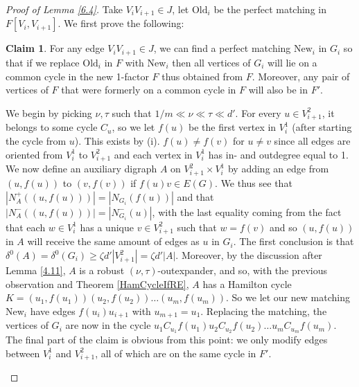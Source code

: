 \documentclass[10pt,letterpaper, reqno]{amsart}
\theoremstyle{definition}
\numberwithin{equation}{section}
\newtheorem*{claimnonum}{Claim}
\begin{document}
\begin{proof}[Proof of Lemma \ref{6.4}]
	Take $V_i V_{i+1} \in J$, let $\text{Old}_i$ be the perfect matching in $F[V_i,V_{i+1}]$. We first prove the following:
	
	\begin{claimnonum}
		For any edge $V_i V_{i+1} \in J$, we can find a perfect matching $\text{New}_i$ in $G_i$ so that if we replace $\text{Old}_i$ in $F$ with New$_i$ then all vertices of $G_i$ will lie on a common cycle in the new 1-factor $F$ thus obtained from $F$. Moreover, any pair of vertices of $F$ that were formerly on a common cycle in $F$ will also be in $F'$. 
	\end{claimnonum}
	
	\begin{adjustwidth}{2.5em}{0pt}
		We begin by picking $\nu, \tau$ such that $1/m \ll \nu \ll \tau \ll d'$. For every $u \in V_{i+1}^2$, it belongs to some cycle $C_u$, so we let $f(u)$ be the first vertex in $V_i^1$ (after starting the cycle from $u$). This exists by (i). $f(u) \neq f(v)$ for $u \neq v$ since all edges are oriented from $V_{i}^1$ to $V_{i+1}^2$ and each vertex in $V_{i}^1$ has in- and outdegree equal to 1. We now define an auxiliary digraph $A$ on $V_{i+1}^2 \times V_{i}^1$ by adding an edge from $(u,f(u))$ to $(v, f(v))$ if $f(u)v \in E(G)$. We thus see that $|N_A^+((u,f(u)))| = |N_{G_i}(f(u))|$ and that $|N_A^-((u,f(u)))| = |N_{G_i}^-(u)|$, with the last equality coming from the fact that each $w \in V^1_{i}$ has a unique $v \in V^2_{i+1}$ such that $w=f(v)$ and so $(u,f(u))$ in $A$ will receive the same amount of edges as $u$ in $G_i$. The first conclusion is that $\delta^0(A) = \delta^0(G_i)  \geq \zeta d' |V_{i+1}^2| = \zeta d' |A|$. Moreover, by the discussion after Lemma \ref{4.11}, $A$ is a robust $(\nu,\tau)$-outexpander, and so, with the previous observation and Theorem \ref{HamCycleIfRE}, $A$ has a Hamilton cycle $K = (u_1, f(u_1)) (u_2,f(u_2)) \dots (u_m, f(u_m))$. So we let our new matching New$_i$ have edges $f(u_i)u_{i+1}$ with $u_{m+1}=u_1$. Replacing the matching, the vertices of $G_i$ are now in the cycle $u_1 C_{u_1} f(u_1) u_2 C_{u_2} f(u_2) \dots u_m C_{u_m}f(u_m)$. The final part of the claim is obvious from this point: we only modify edges between $V^1_i$ and $V^2_{i+1}$, all of which are on the same cycle in $F'$.
	\end{adjustwidth}
	

\end{proof}
\end{document}

